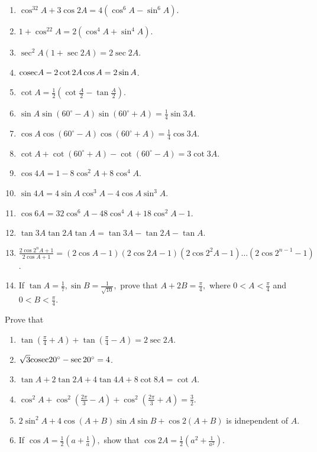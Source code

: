 \begin{enumerate}[resume]
\item $\cos^32A + 3\cos 2A = 4(\cos^6A - \sin^6A)$.
\item $1 + \cos^22A = 2(\cos^4A + \sin^4A)$.
\item $\sec^2A(1 + \sec2A) = 2\sec2A$.
\item ${\rm cosec} A - 2\cot 2A\cos A = 2\sin A$.
\item $\cot A = \frac{1}{2}\left(\cot\frac{A}{2} - \tan\frac{A}{2}\right)$.
\item $\sin A\sin(60^\circ - A)\sin(60^\circ + A) = \frac{1}{4}\sin 3A$.
\item $\cos A\cos(60^\circ - A)\cos(60^\circ + A) = \frac{1}{4}\cos 3A$.
\item $\cot A + \cot(60^\circ + A) - \cot(60^\circ - A) = 3\cot 3A$.
\item $\cos 4A = 1 - 8\cos^2A + 8\cos^4A$.
\item $\sin 4A = 4\sin A\cos^3A - 4\cos A\sin^3A$.
\item $\cos 6A = 32\cos^6A - 48\cos^4A + 18\cos^2A - 1$.
\item $\tan 3A\tan 2A\tan A = \tan 3A - \tan 2A - \tan A$.
\item $\frac{2\cos2^nA + 1}{2\cos A + 1} = (2\cos A - 1)(2\cos 2A - 1)(2\cos2^2A - 1)\ldots(2\cos2^{n - 1} - 1)$.
\item If $\tan A= \frac{1}{7}, \sin B = \frac{1}{\sqrt{10}},$ prove that $A + 2B = \frac{\pi}{4},$ where $0 < A <
    \frac{\pi}{4}$ and  $0 < B < \frac{\pi}{4}$.
\end{enumerate}

Prove that

\begin{enumerate}[resume]
\item $\tan\left(\frac{\pi}{4} + A\right) + \tan\left(\frac{\pi}{4} - A\right) = 2\sec2A$.
\item $\sqrt{3}{\rm cosec} 20^\circ - \sec 20^\circ = 4$.
\item $\tan A + 2\tan 2A + 4\tan 4A + 8\cot 8A = \cot A$.
\item $\cos^2A + \cos^2\left(\frac{2\pi}{3} - A\right) + \cos^2\left(\frac{2\pi}{3} + A\right) = \frac{3}{2}$.
\item $2\sin^2A + 4\cos (A + B)\sin A\sin B + \cos2(A + B)$ is idnependent of $A$.
\item If $\cos A = \frac{1}{2}\left(a + \frac{1}{a}\right),$ show that $\cos 2A = \frac{1}{2}\left(a^2 +
  \frac{1}{a^2}\right)$.
\end{enumerate}


